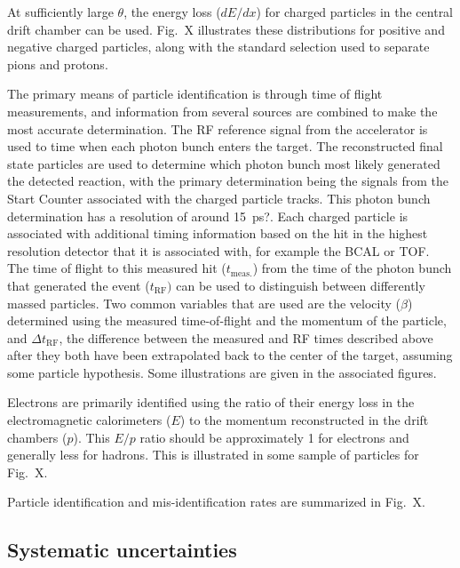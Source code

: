 At sufficiently large $\theta$, the energy loss ($dE/dx$) for charged particles in the central drift chamber can be used.   Fig.~X illustrates these distributions for positive and negative charged particles, along with the standard selection used to separate pions and protons.

The primary means of particle identification is through time of flight measurements, and information from several sources are combined to make the most accurate determination.  The RF reference signal from the accelerator is used to time when each photon bunch enters the target.  The reconstructed final state particles are used to determine which photon bunch most likely generated the detected reaction, with the primary determination being the signals from the Start Counter associated with the charged particle tracks.  This photon bunch determination has a resolution of around 15~ps?. Each charged particle is associated with additional timing information based on the hit in the highest resolution detector that it is associated with, for example the BCAL or TOF.  The time of flight to this measured hit ($t_\mathrm{meas.}$) from the time of the photon bunch that generated the event ($t_\mathrm{RF})$ can be used to distinguish between differently massed particles.  Two common variables that are used are the velocity ($\beta$) determined using the measured time-of-flight and the momentum of the particle, and $\Delta t_\mathrm{RF}$, the difference between the measured and RF times described above after they both have been extrapolated back to the center of the target, assuming some particle hypothesis.
Some illustrations are given in the associated figures.

Electrons are primarily identified using the ratio of their energy loss in the electromagnetic calorimeters ($E$) to the momentum reconstructed in the drift chambers ($p$).  This $E/p$ ratio should be approximately 1 for electrons and generally less for hadrons.  This is illustrated in some sample of particles for Fig.~X.

Particle identification and mis-identification rates are summarized in Fig.~X.

\subsection{Systematic uncertainties \label{sec:systematics}}
